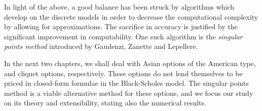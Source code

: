 In light of the above, a good balance has been struck by algorithms which develop on the discrete models in order to decrease the computational complexity by allowing for approximations. The sacrifice in accuracy is justified by the significant improvement in computability. One such algorithm is the \emph{singular points method} introduced by Gaudenzi, Zanette and Lepellere.

In the next two chapters, we shall deal with Asian options of the American type, and cliquet options, respectively. These options do not lend themselves to be priced in closed-form formulae in the Black-Scholes model. The singular points method is a viable alternative method for these options, and we focus our study on its theory and extensibility, stating also the numerical results.


